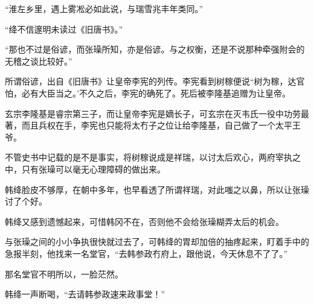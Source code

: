 “淮左乡里，遇上雾凇必如此说，与瑞雪兆丰年类同。”

“绛不信邃明未读过《旧唐书》。”

“那也不过是俗谚，而张璪所知，亦是俗谚。与之权衡，还是不说那种牵强附会的无稽之谈比较好。”

所谓俗谚，出自《旧唐书》让皇帝李宪的列传。李宪看到树稼便说“树为稼，达官怕，必有大臣当之。’不久之后，李宪的确死了。死后被李隆基追赠为让皇帝。

玄宗李隆基是睿宗第三子，而让皇帝李宪是嫡长子，可玄宗在灭韦氏一役中功劳最著，而且兵权在手，李宪也只能将太冇子之位让给李隆基，自己做了一个太平王爷。

不管史书中记载的是不是事实，将树稼说成是祥瑞，以讨太后欢心，两府宰执之中，只有张璪可以毫无心理障碍的做出来。

韩绛脸皮不够厚，在朝中多年，也早看透了所谓祥瑞，对此嗤之以鼻，所以让张璪讨了个好。

韩绛又感到遗憾起来，可惜韩冈不在，否则他不会给张璪糊弄太后的机会。

与张璪之间的小小争执很快就过去了，可韩绛的胃却加倍的抽疼起来，盯着手中的急报半刻，他找来一名堂官，“去韩参政冇府上，跟他说，今天休息不了了。”

那名堂官不明所以，一脸茫然。

韩绛一声断喝，“去请韩参政速来政事堂！”

